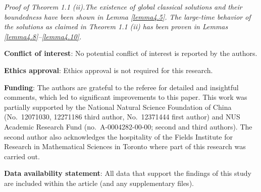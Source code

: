 \documentclass[12pt]{article}
\theoremstyle{plain}
\theoremstyle{definition}
\numberwithin{equation}{section}
\begin{document}
\vspace{.5cm}

\it {Proof of Theorem 1.1 (ii).}\rm   \quad  The existence of global classical solutions and their boundedness have been shown in Lemma \ref{lemma4.5}.  The large-time behavior of the solutions  as claimed in Theorem 1.1 (ii) has been proven in Lemmas \ref{lemma4.8}--\ref{lemma4.10}.

\vspace{.7cm}

{\bf Conflict of interest}:
No potential conflict of interest is reported by the authors.

{\bf Ethics approval}:
Ethics approval is not required for this research.

{\bf Funding}: The authors are grateful to the referee for detailed and
insightful comments, which led to significant improvements to this paper.
This work was partially supported by the National Natural Science Foundation of China (No.~12071030, 12271186  third author, No.~12371444 first author) and NUS Academic Research Fund (no.~A-0004282-00-00; second and third authors). The second author also acknowledges the hospitality of the Fields Institute for Research in Mathematical Sciences in Toronto where part of this research was carried out.

{\bf Data availability statement}:
All data that support the findings of this study are included within the article (and any supplementary
files).
\end{document}
